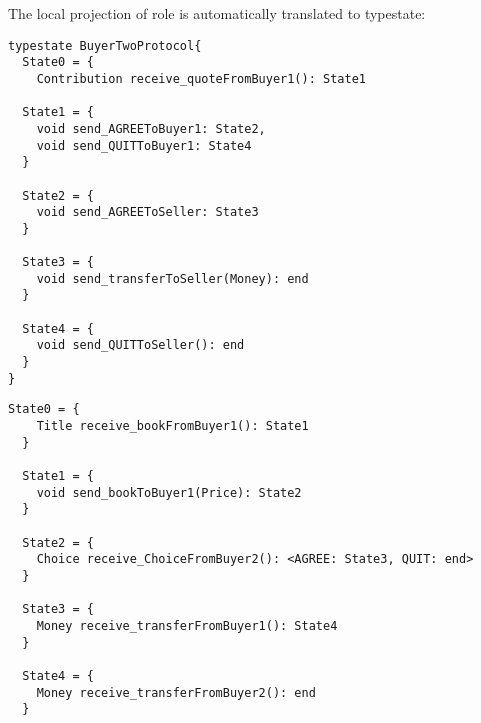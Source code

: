 The local projection of role \BuyerTwo is automatically translated to typestate:

\begin{lstlisting}[caption={Typestate for Role \BuyerTwo}]
typestate BuyerTwoProtocol{
  State0 = {
    Contribution receive_quoteFromBuyer1(): State1

  State1 = {
    void send_AGREEToBuyer1: State2,
    void send_QUITToBuyer1: State4
  }

  State2 = {
    void send_AGREEToSeller: State3
  }

  State3 = {
    void send_transferToSeller(Money): end
  }

  State4 = {
    void send_QUITToSeller(): end
  }
}
\end{lstlisting}


\begin{lstlisting}[caption={Typestate for Role \Seller}]
  State0 = {
    Title receive_bookFromBuyer1(): State1
  }

  State1 = {
    void send_bookToBuyer1(Price): State2
  }

  State2 = {
    Choice receive_ChoiceFromBuyer2(): <AGREE: State3, QUIT: end>
  }

  State3 = {
    Money receive_transferFromBuyer1(): State4
  }

  State4 = {
    Money receive_transferFromBuyer2(): end
  }
\end{lstlisting}
